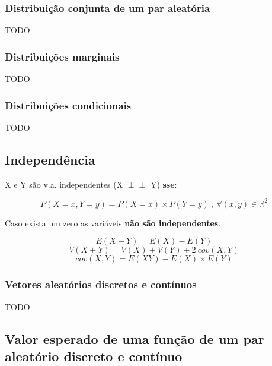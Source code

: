 \documentclass[11pt, a4paper]{article}
\newcommand\independent{\perp\!\!\!\!\!\!\perp}
\begin{document}
\subsubsection*{Distribuição conjunta de um par aleatória}

TODO

\subsubsection*{Distribuições marginais}

TODO

\subsubsection*{Distribuições condicionais}

TODO

\subsection{Independência}

X e Y são v.a. independentes (X $\independent$ Y) \textbf{sse}:

\begin{equation*}
    P(X = x, Y = y) = P(X = x) \times P(Y = y) \ , \
    \forall(x, y) \in \mathbb{R}^2
\end{equation*}

Caso exista um zero as variáveis \textbf{não são independentes}.

\begin{equation*}
    E(X \pm Y) = E(X) - E(Y)
\end{equation*}
\begin{equation*}
    V(X \pm Y) = V(X) + V(Y) \pm 2 \ cov(X,Y)
\end{equation*}
\begin{equation*}
    cov(X,Y) = E(XY) - E(X) \times E(Y)
\end{equation*}

\subsubsection*{Vetores aleatórios discretos e contínuos}

TODO

\subsection*{Valor esperado de uma função de um par aleatório discreto e contínuo}
\end{document}
